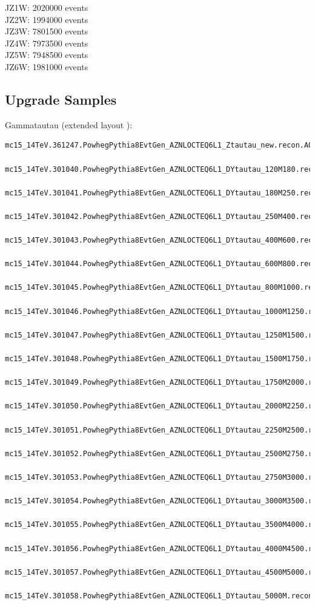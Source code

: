 JZ1W: 2020000 events \\
JZ2W: 1994000 events \\
JZ3W: 7801500 events \\
JZ4W: 7973500 events \\
JZ5W: 7948500 events \\
JZ6W: 1981000 events \\

\subsection{Upgrade Samples}
Gammatautau (extended layout \cite{itk_layout_slides}):
\begin{lstlisting}[basicstyle=\small\ttfamily, breaklines=true]
  mc15_14TeV.361247.PowhegPythia8EvtGen_AZNLOCTEQ6L1_Ztautau_new.recon.AOD.e4805_s2987_s2999_r8820
  mc15_14TeV.301040.PowhegPythia8EvtGen_AZNLOCTEQ6L1_DYtautau_120M180.recon.AOD.e5323_s2987_s2999_r8820
  mc15_14TeV.301041.PowhegPythia8EvtGen_AZNLOCTEQ6L1_DYtautau_180M250.recon.AOD.e5323_s2987_s2999_r8820
  mc15_14TeV.301042.PowhegPythia8EvtGen_AZNLOCTEQ6L1_DYtautau_250M400.recon.AOD.e5323_s2987_s2999_r8820
  mc15_14TeV.301043.PowhegPythia8EvtGen_AZNLOCTEQ6L1_DYtautau_400M600.recon.AOD.e5323_s2987_s2999_r8820
  mc15_14TeV.301044.PowhegPythia8EvtGen_AZNLOCTEQ6L1_DYtautau_600M800.recon.AOD.e5323_s2987_s2999_r8820
  mc15_14TeV.301045.PowhegPythia8EvtGen_AZNLOCTEQ6L1_DYtautau_800M1000.recon.AOD.e5323_s2987_s2999_r8820
  mc15_14TeV.301046.PowhegPythia8EvtGen_AZNLOCTEQ6L1_DYtautau_1000M1250.recon.AOD.e5323_s2987_s2999_r8820
  mc15_14TeV.301047.PowhegPythia8EvtGen_AZNLOCTEQ6L1_DYtautau_1250M1500.recon.AOD.e5323_s2987_s2999_r8820
  mc15_14TeV.301048.PowhegPythia8EvtGen_AZNLOCTEQ6L1_DYtautau_1500M1750.recon.AOD.e5323_s2987_s2999_r8820
  mc15_14TeV.301049.PowhegPythia8EvtGen_AZNLOCTEQ6L1_DYtautau_1750M2000.recon.AOD.e5323_s2987_s2999_r8820
  mc15_14TeV.301050.PowhegPythia8EvtGen_AZNLOCTEQ6L1_DYtautau_2000M2250.recon.AOD.e5323_s2987_s2999_r8820
  mc15_14TeV.301051.PowhegPythia8EvtGen_AZNLOCTEQ6L1_DYtautau_2250M2500.recon.AOD.e5323_s2987_s2999_r8820
  mc15_14TeV.301052.PowhegPythia8EvtGen_AZNLOCTEQ6L1_DYtautau_2500M2750.recon.AOD.e5323_s2987_s2999_r8820
  mc15_14TeV.301053.PowhegPythia8EvtGen_AZNLOCTEQ6L1_DYtautau_2750M3000.recon.AOD.e5323_s2987_s2999_r8820
  mc15_14TeV.301054.PowhegPythia8EvtGen_AZNLOCTEQ6L1_DYtautau_3000M3500.recon.AOD.e5323_s2987_s2999_r8820
  mc15_14TeV.301055.PowhegPythia8EvtGen_AZNLOCTEQ6L1_DYtautau_3500M4000.recon.AOD.e5323_s2987_s2999_r8820
  mc15_14TeV.301056.PowhegPythia8EvtGen_AZNLOCTEQ6L1_DYtautau_4000M4500.recon.AOD.e5323_s2987_s2999_r8820
  mc15_14TeV.301057.PowhegPythia8EvtGen_AZNLOCTEQ6L1_DYtautau_4500M5000.recon.AOD.e5323_s2987_s2999_r8820
  mc15_14TeV.301058.PowhegPythia8EvtGen_AZNLOCTEQ6L1_DYtautau_5000M.recon.AOD.e5323_s2987_s2999_r8820
\end{lstlisting}

